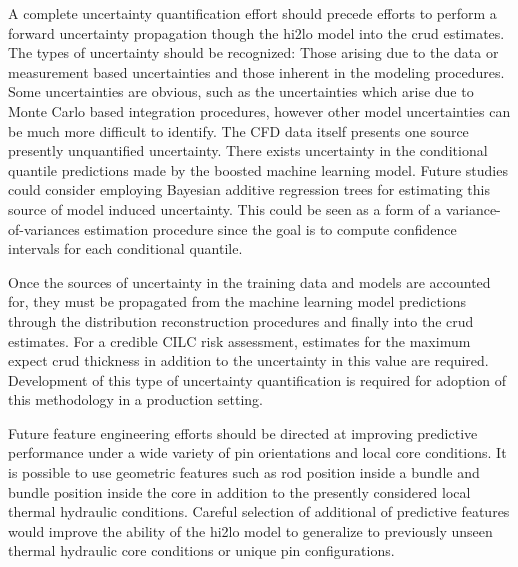 A complete uncertainty quantification effort should precede efforts to perform a forward uncertainty propagation though the hi2lo model into the crud estimates.  The types of uncertainty should be recognized: Those arising due to the data or measurement based uncertainties and those inherent in the modeling procedures.  Some uncertainties are obvious, such as the uncertainties which arise due to Monte Carlo based integration procedures, however other model uncertainties can be much more difficult to identify.  The CFD data itself presents one source presently unquantified uncertainty.  There exists uncertainty in the conditional quantile predictions made by the boosted machine learning model.  Future studies could consider employing Bayesian additive regression trees for estimating this source of model induced uncertainty.  This could be seen as a form of a variance-of-variances estimation procedure since the goal is to compute confidence intervals for each conditional quantile.
    
Once the sources of uncertainty in the training data and models are accounted for, they must be propagated from the machine learning model predictions through the distribution reconstruction procedures and finally into the crud estimates.  For a credible CILC risk assessment, estimates for the maximum expect crud thickness in addition to the uncertainty in this value are required. Development of this type of uncertainty quantification is required for adoption of this methodology in a production setting.

Future feature engineering efforts should be directed at improving predictive performance under a wide variety of pin orientations and local core conditions.  It is possible to use geometric features such as rod position inside a bundle and bundle position inside the core in addition to the presently considered local thermal hydraulic conditions.  Careful selection of additional of predictive features would improve the ability of the hi2lo model to generalize to previously unseen thermal hydraulic core conditions or unique pin configurations.
	
	
